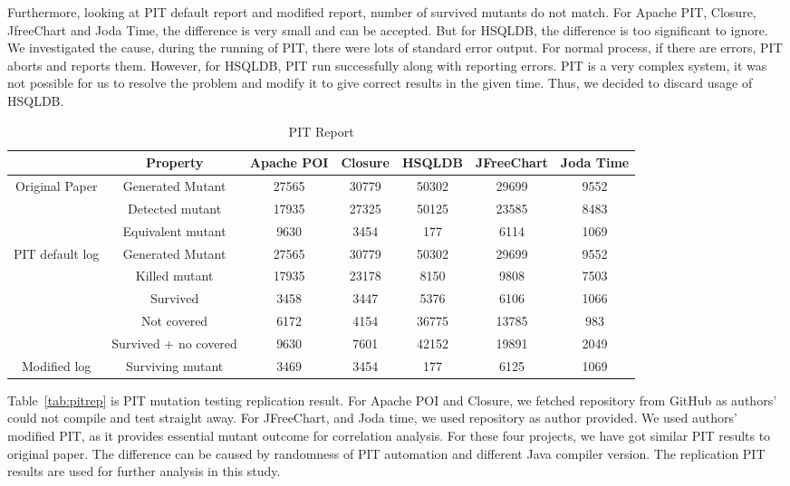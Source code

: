 Furthermore, looking at PIT default report and modified report, number of survived mutants do not match. For Apache PIT, Closure, JfreeChart and Joda Time, the difference is very small and can be accepted. But for HSQLDB, the difference is too significant to ignore. We investigated the cause, during the running of PIT, there were lots of standard error output. For normal process, if there are errors, PIT aborts and reports them. However, for HSQLDB, PIT run successfully along with reporting errors. PIT is a very complex system, it was not possible for us to resolve the problem and modify it to give correct results in the given time. Thus, we decided to discard usage of HSQLDB.

\begin{table}[h]
	\caption{PIT Report}
	\label{tab:pit}
	\begin{minipage}{\columnwidth}
		\begin{center}
			\begin{tabular}{|c|c|c|c|c|c|c|}
				\hline
				&Property & Apache POI & Closure & HSQLDB& JFreeChart & Joda Time \\
				\hline
				Original Paper & Generated Mutant & 27565 & 30779& 50302 & 29699 & 9552\\
				& Detected mutant & 17935 & 27325 & 50125 &23585 & 8483\\
				& Equivalent mutant & 9630 & 3454 & 177 &6114 & 1069\\
				\hline
				PIT default log & Generated Mutant & 27565 & 30779& 50302 & 29699 & 9552\\
				& Killed mutant & 17935 & 23178 & 8150 &9808 & 7503\\
				& Survived & 3458 & 3447 & 5376 &6106 & 1066\\
				& Not covered & 6172 & 4154 & 36775 & 13785 & 983\\
				& Survived + no covered & 9630 & 7601 & 42152 & 19891 & 2049\\
				\hline
				Modified log & Surviving mutant & 3469& 3454& 177 & 6125& 1069\\
				\hline
			\end{tabular}
		\end{center}
		\bigskip
	\end{minipage}
\end{table}

Table~\ref{tab:pitrep} is PIT mutation testing replication result. For Apache POI and Closure, we fetched repository from GitHub as authors' could not compile and test straight away. For JFreeChart, and Joda time, we used repository as author provided. We used authors' modified PIT, as it provides essential mutant outcome for correlation analysis. For these four projects, we have got similar PIT results to original paper. The difference can be caused by randomness of PIT automation and different Java compiler version. The replication PIT results are used for further analysis in this study.

